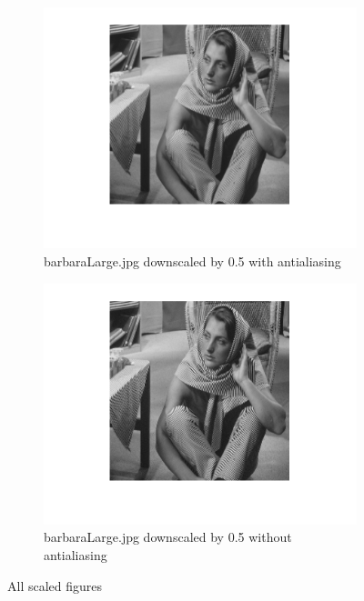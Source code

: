 \documentclass{article}
\begin{document}
\begin{figure}
    \begin{subfigure}[b]{0.4\linewidth}
        \centering
        \includegraphics[width=\linewidth]{barb05aa.png}
        \caption{barbaraLarge.jpg downscaled by 0.5 with antialiasing}
    \end{subfigure}
    \begin{subfigure}[b]{0.4\linewidth}
        \centering
        \includegraphics[width=\linewidth]{barb05noaa.png}
        \caption{barbaraLarge.jpg downscaled by 0.5 without antialiasing}
    \end{subfigure}
    \caption{All scaled figures}
\end{figure}
\end{document}
